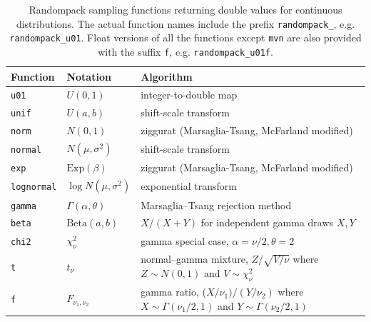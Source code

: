 \documentclass[manuscript,screen,review]{acmart}
\begin{document}
\begin{table}[t]
\centering
\caption{Randompack sampling functions returning double values for
  continuous distributions. The actual function names include the
  prefix \texttt{randompack\_}, e.g. \texttt{randompack\_u01}. Float
  versions of all the functions except \texttt{mvn} are also provided
  with the suffix \texttt{f}, e.g. \texttt{randompack\_u01f}.}
\label{tab:continuous}
\begin{tabular}{lll}
  \toprule
  Function             & Notation                             & Algorithm \\
  \midrule
  \texttt{u01}         & $U(0,1)$                             & integer-to-double map                                                        \\
  \texttt{unif}        & $U(a,b)$                             & shift-scale transform                                                        \\
  \texttt{norm}        & $N(0,1)$                             & ziggurat (Marsaglia-Tsang, McFarland modified)                               \\
  \texttt{normal}      & $N(\mu,\sigma^2)$                    & shift-scale transform                                                        \\
  \texttt{exp}         & $\mathrm{Exp}(\beta)$                & ziggurat (Marsaglia-Tsang, McFarland modified)                               \\
  \texttt{lognormal}   & $\log N(\mu,\sigma^2)$               & exponential transform                                                        \\
  \texttt{gamma}       & $\Gamma(\alpha,\theta)$              & Marsaglia--Tsang rejection method                                            \\
  \texttt{beta}        & $\mathrm{Beta}(a,b)$                 & $X/(X+Y)$ for independent gamma draws $X,Y$                                  \\
  \texttt{chi2}        & $\chi^2_\nu$                         & gamma special case, $\alpha=\nu/2, \theta=2$                                 \\
  \texttt{t}           & $t_\nu$            & normal--gamma mixture, $Z/\sqrt{V/\nu}$ where $Z\sim N(0,1)$ and $V\sim \chi_\nu^2$            \\
  \texttt{f}           & $F_{\nu_1,\nu_2}$  & gamma ratio, ($X/\nu_1)/(Y/\nu_2)$ where $X\sim\Gamma(\nu_1/2,1)$ and $Y\sim\Gamma(\nu_2/2,1)$ \\

\end{tabular}
\end{table}
\end{document}
